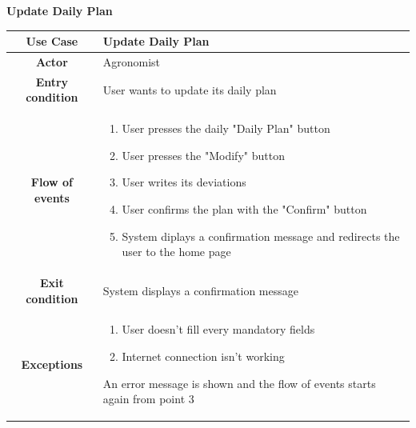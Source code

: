 \documentclass[table, 12pt]{article}
\begin{document}
\begin{itemize}
            \begin{table}[H]
                \item[] \textbf{Update Daily Plan}
                \item[] 
                \centering
                \begin{tabular}{|c| m{}|}
                    \hline
                    \textbf{Use Case} & Update Daily Plan\\ \hline
                    \textbf{Actor} & Agronomist\\ \hline
                    \textbf{Entry condition} & User wants to update its daily plan\\  \hline
                    \textbf{Flow of events} & \begin{enumerate}
                                                \item User presses the daily "Daily Plan" button
                                                \item User presses the "Modify" button
                                                \item User writes its deviations
                                                \item User confirms the plan with the "Confirm" button
                                                \item System diplays a confirmation message and redirects the user to the home page
                                            \end{enumerate}\\ \hline
                    \textbf{Exit condition} & System displays a confirmation message\\ \hline
                    \textbf{Exceptions} &  \begin{enumerate}
                        \item User doesn't fill every mandatory fields
                        \item Internet connection isn't working
                    \end{enumerate}
                    An error message is shown and the flow of events starts again from point 3\\ \hline                    
                    
                \end{tabular}
            \end{table}


\end{itemize}
\end{document}
